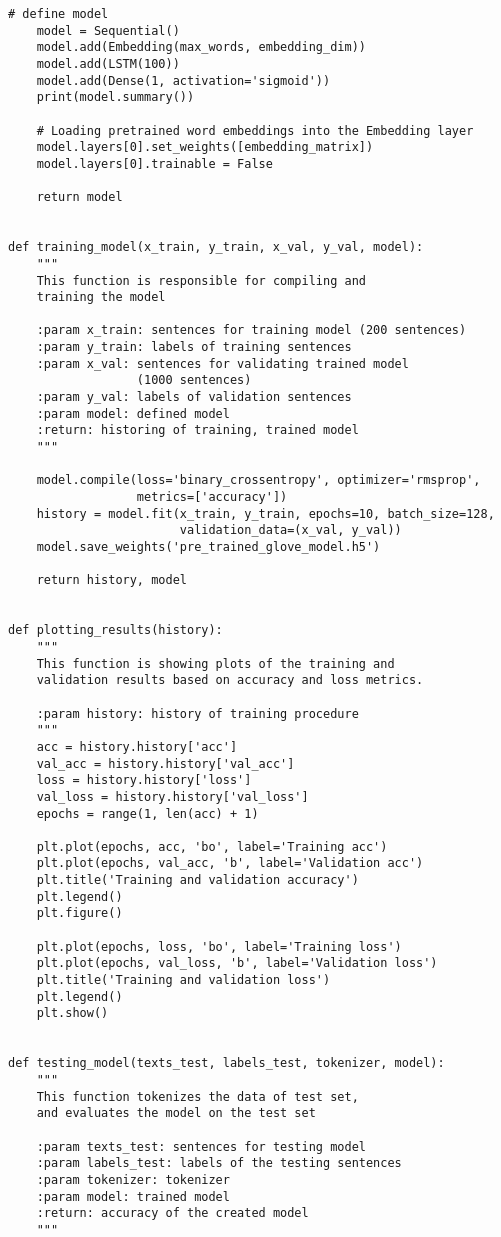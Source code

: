 \begin{lstlisting}[language=iPython]
	# define model
	model = Sequential()
	model.add(Embedding(max_words, embedding_dim))
	model.add(LSTM(100))
	model.add(Dense(1, activation='sigmoid'))
	print(model.summary())
	
	# Loading pretrained word embeddings into the Embedding layer
	model.layers[0].set_weights([embedding_matrix])
	model.layers[0].trainable = False
	
	return model


def training_model(x_train, y_train, x_val, y_val, model):
	"""
	This function is responsible for compiling and
	training the model
	
	:param x_train: sentences for training model (200 sentences)
	:param y_train: labels of training sentences
	:param x_val: sentences for validating trained model 
				  (1000 sentences)
	:param y_val: labels of validation sentences
	:param model: defined model
	:return: historing of training, trained model
	"""
	
	model.compile(loss='binary_crossentropy', optimizer='rmsprop',
				  metrics=['accuracy'])
	history = model.fit(x_train, y_train, epochs=10, batch_size=128,
						validation_data=(x_val, y_val))
	model.save_weights('pre_trained_glove_model.h5')
	
	return history, model


def plotting_results(history):
	"""
	This function is showing plots of the training and 
	validation results based on accuracy and loss metrics.
	
	:param history: history of training procedure
	"""
	acc = history.history['acc']
	val_acc = history.history['val_acc']
	loss = history.history['loss']
	val_loss = history.history['val_loss']
	epochs = range(1, len(acc) + 1)
	
	plt.plot(epochs, acc, 'bo', label='Training acc')
	plt.plot(epochs, val_acc, 'b', label='Validation acc')
	plt.title('Training and validation accuracy')
	plt.legend()
	plt.figure()
	
	plt.plot(epochs, loss, 'bo', label='Training loss')
	plt.plot(epochs, val_loss, 'b', label='Validation loss')
	plt.title('Training and validation loss')
	plt.legend()
	plt.show()


def testing_model(texts_test, labels_test, tokenizer, model):
	"""
	This function tokenizes the data of test set,
	and evaluates the model on the test set
	
	:param texts_test: sentences for testing model
	:param labels_test: labels of the testing sentences
	:param tokenizer: tokenizer
	:param model: trained model
	:return: accuracy of the created model
	"""
	

\end{lstlisting}
